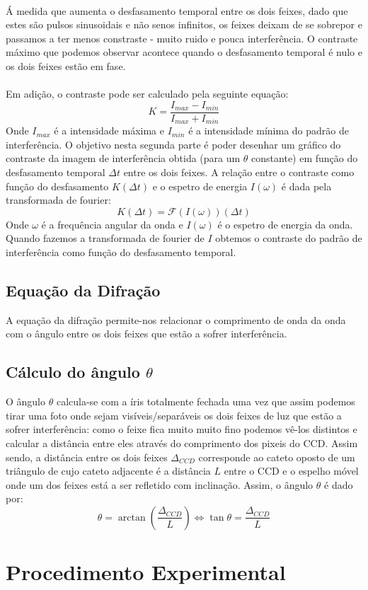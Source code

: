 \documentclass{article}
\begin{document}
\begin{multicols}{2}
\paragraph{}
Á medida que aumenta o desfasamento temporal entre os dois feixes, dado que estes são pulsos sinusoidais e não senos infinitos, os feixes deixam de se sobrepor e passamos a ter menos constraste - muito ruido e pouca interferência.
O contraste máximo que podemos observar acontece quando o desfasamento temporal é nulo e os dois feixes estão em fase.
\paragraph{}
Em adição, o contraste pode ser calculado pela seguinte equação:
\[ K = \frac{I_{max} - I_{min}}{I_{max} + I_{min}} \]
Onde $I_{max}$ é a intensidade máxima e $I_{min}$ é a intensidade mínima do padrão de interferência.
O objetivo nesta segunda parte é poder desenhar um gráfico do contraste da imagem de interferência obtida (para um $\theta$ constante) em função do desfasamento temporal $\Delta t$ entre os dois feixes.
A relação entre o contraste como função do desfasamento $K(\Delta t)$ e o espetro de energia $I(\omega)$ é dada pela transformada de fourier:
\[ K(\Delta t) = \mathcal{F}(I(\omega))(\Delta t) \]
Onde $\omega$ é a frequência angular da onda e $I(\omega)$ é o espetro de energia da onda.
Quando fazemos a transformada de fourier de $I$ obtemos o contraste do padrão de interferência como função do desfasamento temporal.

\subsection{Equação da Difração}

A equação da difração permite-nos relacionar o comprimento de onda da onda com o ângulo entre os dois feixes que estão a sofrer interferência. 

\subsection{Cálculo do ângulo $\theta$}

O ângulo $\theta$ calcula-se com a íris totalmente fechada uma vez que assim podemos tirar uma foto onde sejam visíveis/separáveis os dois feixes de luz que estão a sofrer interferência: como o feixe fica muito muito fino podemos vê-los distintos e calcular a distância entre eles através do comprimento dos pixeis do CCD. 
Assim sendo, a distância entre os dois feixes $\Delta_{CCD}$ corresponde ao cateto oposto de um triângulo de cujo cateto adjacente é a distância $L$ entre o CCD e o espelho móvel onde um dos feixes está a ser refletido com inclinação. Assim, o ângulo $\theta$ é dado por:
\[ \theta = \arctan \left( \frac{\Delta_{CCD}}{L} \right) \Leftrightarrow \tan \theta = \frac{\Delta_{CCD}}{L} \]

\section{Procedimento Experimental}

\end{multicols}
\end{document}
